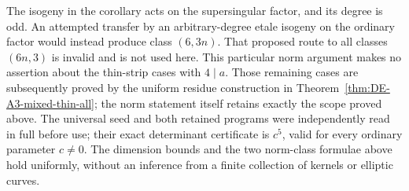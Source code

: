 \begin{remark}
\label{rem:DE-A3-mixed-axis-scope}
The isogeny in the corollary acts on the supersingular factor,
and its degree is odd.
An attempted transfer by an arbitrary-degree etale isogeny on
the ordinary factor would instead produce class $(6,3n)$.
That proposed route to all classes $(6n,3)$ is invalid and is
not used here.  This particular norm argument makes no assertion
about the thin-strip cases with $4\mid a$.
Those remaining cases are subsequently proved by the uniform
residue construction in Theorem~\ref{thm:DE-A3-mixed-thin-all};
the norm statement itself retains exactly the scope proved above.
The universal seed and both retained programs were independently
read in full before use; their exact determinant certificate is
$c^5$, valid for every ordinary parameter $c\ne0$.
The dimension bounds and the two norm-class formulae above
hold uniformly, without an inference from a finite collection
of kernels or elliptic curves.
\end{remark}
